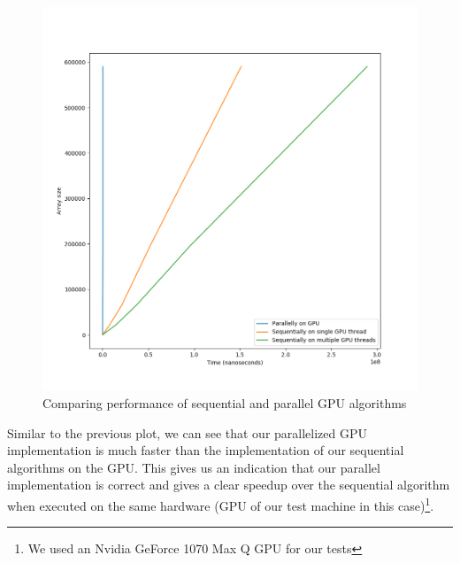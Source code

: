 \documentclass{article}
\begin{document}
\begin{figure}[H]
\hfill\includegraphics[scale=0.5]{Graphics/gpucomp.png}\hspace*{\fill}
\caption{Comparing performance of sequential and parallel GPU algorithms}
\end{figure}
Similar to the previous plot, we can see that our parallelized GPU implementation is much faster than the implementation of our sequential algorithms on the GPU. This gives us an indication that our parallel implementation is correct and gives a clear speedup over the sequential algorithm when executed on the same hardware (GPU of our test machine in this case)\footnote{We used an Nvidia GeForce 1070 Max Q GPU for our tests}.
\end{document}
